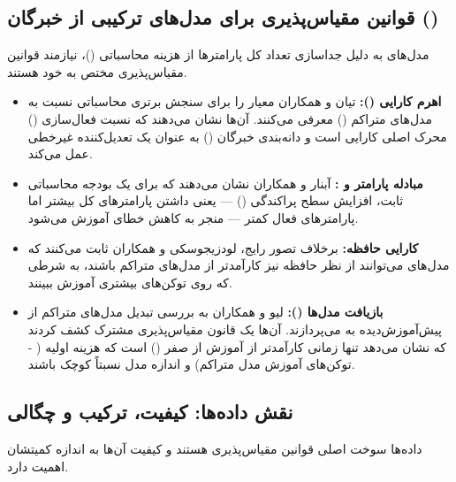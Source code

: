 \subsection{قوانین مقیاس‌پذیری برای مدل‌های ترکیبی از خبرگان ()}
مدل‌های  به دلیل جداسازی تعداد کل پارامترها از هزینه محاسباتی ()، نیازمند قوانین مقیاس‌پذیری مختص به خود هستند.

\begin{itemize}
    \item \textbf{اهرم کارایی ():} تیان و همکاران \cite{tian2025towards} معیار  را برای سنجش برتری محاسباتی  نسبت به مدل‌های متراکم () معرفی می‌کنند. آن‌ها نشان می‌دهند که نسبت فعال‌سازی () محرک اصلی کارایی است و دانه‌بندی خبرگان () به عنوان یک تعدیل‌کننده غیرخطی عمل می‌کند.
    
    \item \textbf{مبادله پارامتر و :} آبنار و همکاران \cite{abnar2025parameters} نشان می‌دهند که برای یک بودجه محاسباتی ثابت، افزایش سطح پراکندگی () — یعنی داشتن پارامترهای کل بیشتر اما پارامترهای فعال کمتر — منجر به کاهش خطای آموزش می‌شود.
    
    \item \textbf{کارایی حافظه:} برخلاف تصور رایج، لودزیجوسکی و همکاران \cite{ludziejewski2025joint} ثابت می‌کنند که مدل‌های  می‌توانند از نظر حافظه نیز کارآمدتر از مدل‌های متراکم باشند، به شرطی که روی توکن‌های بیشتری آموزش ببینند.
    
    \item \textbf{بازیافت مدل‌ها ():} لیو و همکاران \cite{liew2025scaling} به بررسی تبدیل مدل‌های متراکم از پیش‌آموزش‌دیده به  می‌پردازند. آن‌ها یک قانون مقیاس‌پذیری مشترک کشف کردند که نشان می‌دهد  تنها زمانی کارآمدتر از آموزش از صفر () است که هزینه اولیه ( - توکن‌های آموزش مدل متراکم) و اندازه مدل نسبتاً کوچک باشند.
\end{itemize}

\subsection{نقش داده‌ها: کیفیت، ترکیب و چگالی}
داده‌ها سوخت اصلی قوانین مقیاس‌پذیری هستند و کیفیت آن‌ها به اندازه کمیتشان اهمیت دارد.

